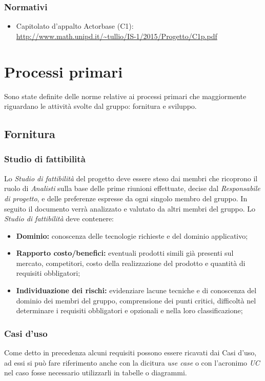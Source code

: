 \documentclass[a4paper]{article}
\begin{document}
			\subsubsection{Normativi}
				\begin{itemize}
					\item Capitolato d'appalto Actorbase (C1): \\
					\url{http://www.math.unipd.it/~tullio/IS-1/2015/Progetto/C1p.pdf}
				\end{itemize}

	\newpage
	\section{Processi primari}
		Sono state definite delle norme relative ai processi primari che maggiormente riguardano le attività
		svolte dal gruppo: fornitura e sviluppo.
		\subsection{Fornitura}
		\subsubsection{Studio di fattibilità}
		Lo \emph{Studio di fattibilità} del progetto deve essere steso dai membri che ricoprono il ruolo di
		\emph{Analisti} sulla base delle prime riunioni effettuate, decise dal \emph{Responsabile di progetto},
		e delle preferenze espresse da ogni singolo membro del gruppo.
		In seguito il documento verrà analizzato e valutato da altri membri del gruppo.
		Lo \emph{Studio di fattibilità} deve contenere:
		\begin{itemize}
			\item \textbf{Dominio:} conoscenza delle tecnologie richieste e del dominio applicativo;
			\item \textbf{Rapporto costo/benefici:} eventuali prodotti simili già presenti sul mercato,
			competitori, costo della
			realizzazione del prodotto e quantità di requisiti obbligatori;
			\item \textbf{Individuazione dei rischi:} evidenziare lacune tecniche e di conoscenza del dominio
			dei membri del gruppo, comprensione
			dei punti critici, difficoltà nel determinare i requisiti obbligatori e opzionali e nella loro
			classificazione;
		\end{itemize}

		\subsubsection{Casi d'uso}
			Come detto in precedenza alcuni requisiti possono essere ricavati dai Casi d'uso, ad essi si
			può fare riferimento anche con la dicitura \emph{use case} o con l'acronimo \emph{UC} nel caso
			fosse  necessario utilizzarli in tabelle o diagrammi.
\end{document}
